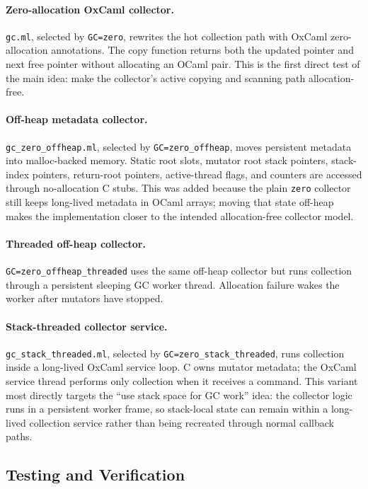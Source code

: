 \documentclass[11pt,a4paper]{article}
\begin{document}
\paragraph{Zero-allocation OxCaml collector.}
\texttt{gc.ml}, selected by \texttt{GC=zero}, rewrites the hot collection path
with OxCaml zero-allocation annotations. The copy function returns both the
updated pointer and next free pointer without allocating an OCaml pair. This is
the first direct test of the main idea: make the collector's active copying and
scanning path allocation-free.

\paragraph{Off-heap metadata collector.}
\texttt{gc\_zero\_offheap.ml}, selected by \texttt{GC=zero\_offheap}, moves
persistent metadata into malloc-backed memory. Static root slots, mutator root
stack pointers, stack-index pointers, return-root pointers, active-thread flags,
and counters are accessed through no-allocation C stubs. This was added because
the plain \texttt{zero} collector still keeps long-lived metadata in OCaml
arrays; moving that state off-heap makes the implementation closer to the
intended allocation-free collector model.

\paragraph{Threaded off-heap collector.}
\texttt{GC=zero\_offheap\_threaded} uses the same off-heap collector but runs
collection through a persistent sleeping GC worker thread. Allocation failure
wakes the worker after mutators have stopped.

\paragraph{Stack-threaded collector service.}
\texttt{gc\_stack\_threaded.ml}, selected by
\texttt{GC=zero\_stack\_threaded}, runs collection inside a long-lived OxCaml
service loop. C owns mutator metadata; the OxCaml service thread performs only
collection when it receives a command. This variant most directly targets the
``use stack space for GC work'' idea: the collector logic runs in a persistent
worker frame, so stack-local state can remain within a long-lived collection
service rather than being recreated through normal callback paths.

\subsection{Testing and Verification}
\end{document}
